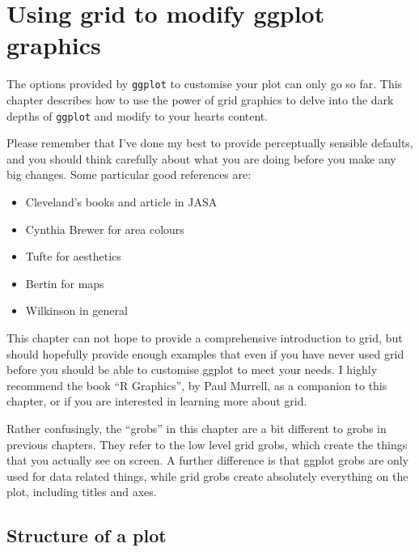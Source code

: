 


\chapter{Using grid to modify ggplot graphics}

The options provided by {\tt ggplot} to customise your plot can only go so far.  This chapter describes how to use the power of grid graphics to delve into the dark depths of {\tt ggplot} and modify to your hearts content.  

Please remember that I've done my best to provide perceptually sensible defaults, and you should think carefully about what you are doing before you make any big changes.  Some particular good references are:

\begin{itemize}
	\item Cleveland's books and article in JASA
	\item Cynthia Brewer for area colours
	\item Tufte for aesthetics
	\item Bertin for maps
	\item Wilkinson in general
\end{itemize}

This chapter can not hope to provide a comprehensive introduction to grid, but should hopefully provide enough examples that even if you have never used grid before you should be able to customise ggplot to meet your needs.  I highly recommend the book ``R Graphics'', by Paul Murrell, as a companion to this chapter, or if you are interested in learning more about grid.   

Rather confusingly, the ``grobs'' in this chapter are a bit different to grobs in previous chapters.  They refer to the low level grid grobs, which create the things that you actually see on screen.  A further difference is that ggplot grobs are only used for data related things, while grid grobs create absolutely everything on the plot, including titles and axes.

\section{Structure of a plot}\label{sec:structure_of_a_plot}

